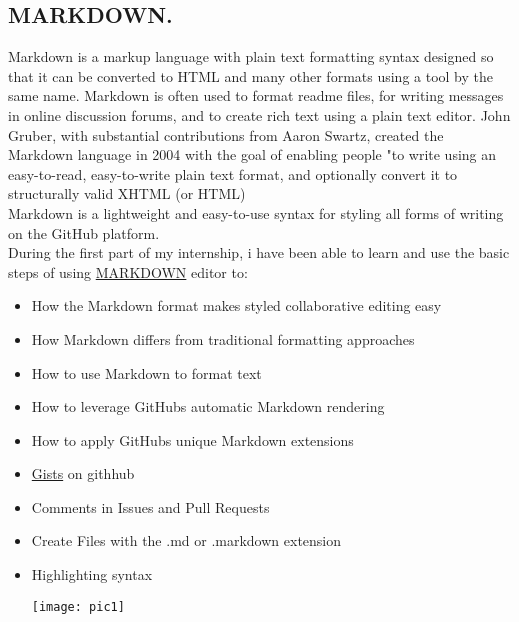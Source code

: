 \documentclass[11pt,utf8]{article}
\begin{document}
\subsection{MARKDOWN.}
\label{sec: introduction to github}
Markdown is a markup language with plain text formatting syntax designed so that it can be converted to HTML and many other formats using a tool by the same name. Markdown is often used to format readme files, for writing messages in online discussion forums, and to create rich text using a plain text editor. John Gruber, with substantial contributions from Aaron Swartz, created the Markdown language in 2004 with the goal of enabling people "to write using an easy-to-read, easy-to-write plain text format, and optionally convert it to structurally valid XHTML (or HTML)\\
Markdown is a lightweight and easy-to-use syntax for styling all forms of writing on the GitHub platform.\\
During the first part of my internship, i have been able to learn and use the basic steps of using \href{https://guides.github.com/features/mastering-markdown/}{MARKDOWN} editor to:   \\
\begin{itemize}
 \item How the Markdown format makes styled collaborative editing easy\\
 \item How Markdown differs from traditional formatting approaches\\
 \item How to use Markdown to format text\\
 \item How to leverage GitHub\textquotesingle s automatic Markdown rendering\\
 \item How to apply GitHub\textquotesingle s unique Markdown extensions\\
 \item \href{https://help.github.com/articles/about-gists/}{Gists} on githhub\\
 \item Comments in Issues and Pull Requests\\
 \item Create Files with the .md or .markdown extension\\
 \item Highlighting syntax\\
  \begin{center}
  \texttt{[image: pic1]}
  \end{center}
 \end {itemize}
\end{document}
